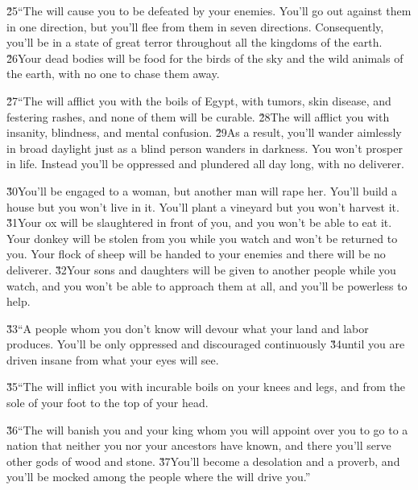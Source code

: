 \v{25}``The  will cause you to be defeated by your enemies. You'll go out against them in one direction, but you'll flee from them in seven directions. Consequently, you'll be in a state of great terror throughout all the kingdoms of the earth. \v{26}Your dead bodies will be food for the birds of the sky and the wild animals of the earth, with no one to chase them away.

\v{27}``The  will afflict you with the boils of Egypt, with tumors, skin disease, and festering rashes, and none of them will be curable. \v{28}The  will afflict you with insanity, blindness, and mental confusion. \v{29}As a result, you'll wander aimlessly in broad daylight just as a blind person wanders in darkness. You won't prosper in life. Instead you'll be oppressed and plundered all day long, with no deliverer.

\v{30}You'll be engaged to a woman, but another man will rape her. You'll build a house but you won't live in it. You'll plant a vineyard but you won't harvest it. \v{31}Your ox will be slaughtered in front of you, and you won't be able to eat it. Your donkey will be stolen from you while you watch and won't be returned to you. Your flock of sheep will be handed to your enemies and there will be no deliverer. \v{32}Your sons and daughters will be given to another people while you watch, and you won't be able to approach them at all, and you'll be powerless to help.

\v{33}``A people whom you don't know will devour what your land and labor produces. You'll be only oppressed and discouraged continuously \v{34}until you are driven insane from what your eyes will see.

\v{35}``The  will inflict you with incurable boils on your knees and legs, and from the sole of your foot to the top of your head.

\v{36}``The  will banish you and your king whom you will appoint over you to go to a nation that neither you nor your ancestors have known, and there you'll serve other gods of wood and stone. \v{37}You'll become a desolation and a proverb, and you'll be mocked among the people where the  will drive you.''

